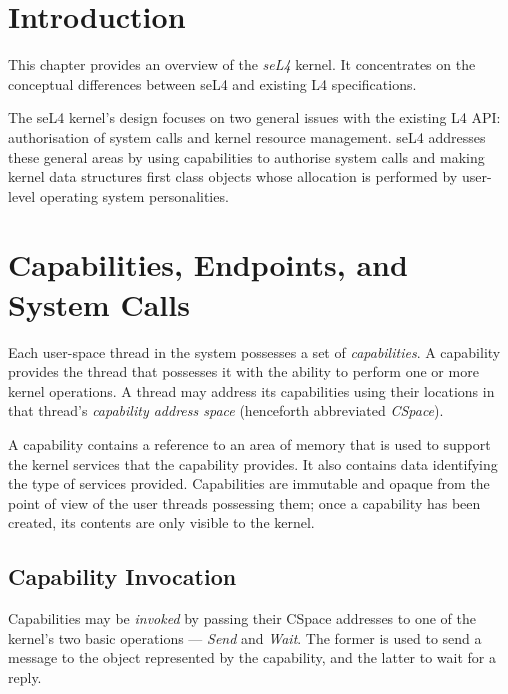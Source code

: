 %
%
%
%

\section[intro]{Introduction}

This chapter provides an overview of the \emph{seL4} kernel. It
concentrates on the conceptual differences between seL4 and existing
L4 specifications.

The seL4 kernel's design focuses on two general issues with the
existing L4 API: authorisation of system calls and kernel resource
management. seL4 addresses these general areas by using capabilities
to authorise system calls and making kernel data structures first
class objects whose allocation is performed by user-level operating
system personalities.

\section[caps]{Capabilities, Endpoints, and System Calls}

Each user-space thread in the system possesses a set of \emph{capabilities}. A
capability provides the thread that possesses it with the ability to perform one
or more kernel operations. A thread may address its capabilities using their
locations in that thread's \emph{capability address space} (henceforth
abbreviated \emph{CSpace}).

A capability contains a reference to an area of memory that is used to support
the kernel services that the capability provides. It also contains data
identifying the type of services provided. Capabilities are immutable and
opaque from the point of view of the user threads possessing them; once a
capability has been created, its contents are only visible to the kernel.

\subsection{Capability Invocation}

Capabilities may be \emph{invoked} by passing their CSpace addresses to one of
the kernel's two basic operations --- \emph{Send} and \emph{Wait}. The former
is used to send a message to the object represented by the capability, and the
latter to wait for a reply.

